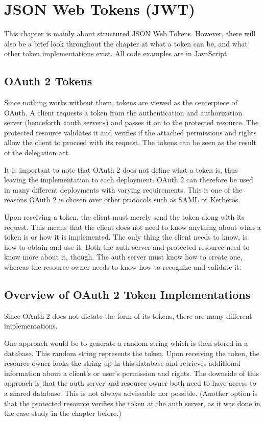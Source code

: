 \section{JSON Web Tokens (JWT)}

This chapter is mainly about structured JSON Web Tokens. However, there will also be a brief look throughout the chapter at what a token can be, and what other token implementations exist. All code examples are in JavaScript.

\subsection{OAuth 2 Tokens}

Since nothing works without them, tokens are viewed as the centerpiece of OAuth. A client requests a token from the authentication and authorization server (henceforth «auth server») and passes it on to the protected resource. The protected resource validates it and verifies if the attached permissions and rights allow the client to proceed with its request. The tokens can be seen as the result of the delegation act.

It is important to note that OAuth 2 does not define what a token is, thus leaving the implementation to each deployment. OAuth 2 can therefore be used in many different deployments with varying requirements. This is one of the reasons OAuth 2 is chosen over other protocols such as SAML or Kerberos.

Upon receiving a token, the client must merely send the token along with its request. This means that the client does not need to know anything about what a token is or how it is implemented. The only thing the client needs to know, is how to obtain and use it. Both the auth server and protected resource need to know more about it, though. The auth server must know how to create one, whereas the resource owner needs to know how to recognize and validate it.

\subsection{Overview of OAuth 2 Token Implementations}

Since OAuth 2 does not dictate the form of its tokens, there are many different implementations. 

One approach would be to generate a random string which is then stored in a database. This random string represents the token. Upon receiving the token, the resource owner looks the string up in this database and retrieves additional information about a client's or user's permission and rights. The downside of this approach is that the auth server and resource owner both need to have access to a shared database. This is not always adviseable nor possible. (Another option is that the protected resource verifies the token at the auth server, as it was done in the case study in the chapter before.)

